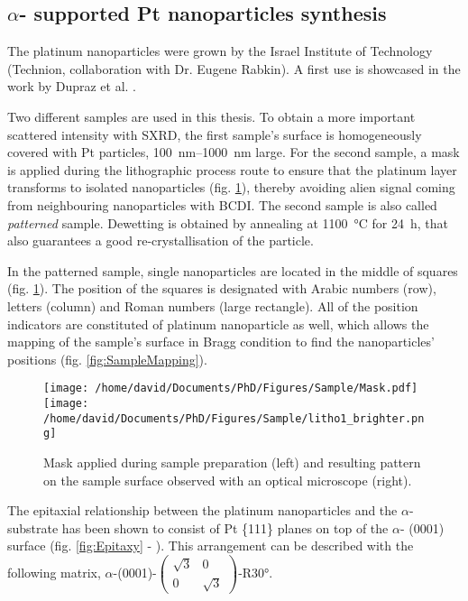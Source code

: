 \subsection{$\alpha$- supported Pt nanoparticles synthesis}\label{sec:PtParticles}

The platinum nanoparticles were grown by the Israel Institute of Technology (Technion, collaboration with Dr. Eugene Rabkin).
A first use is showcased in the work by Dupraz et al. \parencite*{Dupraz2017}.

Two different samples are used in this thesis.
To obtain a more important scattered intensity with SXRD, the first sample's surface is homogeneously covered with Pt particles, \qtyrange{100}{1000}{\nm} large.
For the second sample, a mask is applied during the lithographic process route to ensure that the platinum layer transforms to isolated nanoparticles (fig. \ref{fig:Mask}), thereby avoiding alien signal coming from neighbouring nanoparticles with BCDI.
The second sample is also called \textit{patterned} sample.
Dewetting is obtained by annealing at \qty{1100}{\degreeCelsius} for \qty{24}{\hour}, that also guarantees a good re-crystallisation of the particle.

In the patterned sample, single nanoparticles are located in the middle of squares (fig. \ref{fig:Mask}).
The position of the squares is designated with Arabic numbers (row), letters (column) and Roman numbers (large rectangle).
All of the position indicators are constituted of platinum nanoparticle as well, which allows the mapping of the sample's surface in Bragg condition to find the nanoparticles' positions (fig. \ref{fig:SampleMapping}).

\begin{figure}[!htb]
    \centering
    \texttt{[image: /home/david/Documents/PhD/Figures/Sample/Mask.pdf]}
    \texttt{[image: /home/david/Documents/PhD/Figures/Sample/litho1\_brighter.png]}
    \caption{
        Mask applied during sample preparation (left) and resulting pattern on the sample surface observed with an optical microscope (right).
    }
    \label{fig:Mask}
\end{figure}

The epitaxial relationship between the platinum nanoparticles and the $\alpha$- substrate has been shown to consist of Pt \{111\} planes on top of the $\alpha$- (0001) surface (fig. \ref{fig:Epitaxy} - \cite{Farrow1993}).
This arrangement can be described with the following matrix, $\alpha$-(0001)-$\begin{pmatrix} \sqrt{3} & 0\\ 0 & \sqrt{3} \end{pmatrix}$-R\ang{30}.

